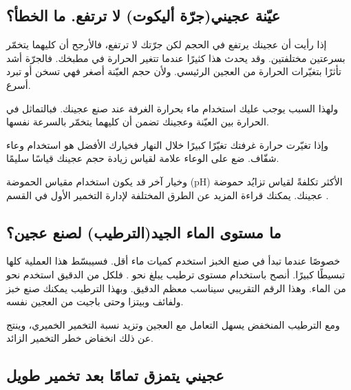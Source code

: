 \subsection{عيّنة عجيني\textenglish{(}جرّة أليكوت\textenglish{)} لا ترتفع. ما الخطأ؟}

إذا رأيت أن عجينك يرتفع في الحجم لكن جرّتك لا ترتفع، فالأرجح أن كليهما يتخمّر بسرعتين مختلفتين. وقد يحدث هذا كثيرًا عندما تتغير الحرارة في مطبخك. فالجرّة أشد تأثرًا بتغيّرات الحرارة من العجين الرئيسي. ولأن حجم العيّنة أصغر فهي تسخن أو تبرد أسرع.

ولهذا السبب يوجب عليك استخدام ماء بحرارة الغرفة عند صنع عجينك. فبالتماثل في الحرارة بين العيّنة وعجينك تضمن أن كليهما يتخمّر بالسرعة نفسها.

وإذا تغيّرت حرارة غرفتك تغيّرًا كبيرًا خلال النهار فخيارك الأفضل هو استخدام وعاء شفّاف. ضع على الوعاء علامة لقياس زيادة حجم عجينك قياسًا سليمًا.

وخيار آخر قد يكون استخدام مقياس الحموضة \textenglish{(pH)} الأكثر تكلفةً لقياس تزايُد حموضة عجينك. يمكنك قراءة المزيد عن الطرق المختلفة لإدارة التخمير الأول في القسم .

\subsection{ما مستوى الماء الجيد\textenglish{(}الترطيب\textenglish{)} لصنع عجين؟}

خصوصًا عندما تبدأ في صنع الخبز استخدم كميات ماء أقل. فسيبسّط هذا العملية كلها تبسيطًا كبيرًا. أنصح باستخدام مستوى ترطيب يبلغ نحو . فلكل  من الدقيق استخدم نحو  من الماء. وهذا الرقم التقريبي سيناسب معظم الدقيق. وبهذا الترطيب يمكنك صنع خبز ولفائف وبيتزا وحتى باجيت من العجين نفسه.

ومع الترطيب المنخفض يسهل التعامل مع العجين وتزيد نسبة التخمير الخميري، وينتج عن ذلك انخفاض خطر التخمير الزائد.

\subsection{عجيني يتمزق تمامًا بعد تخمير طويل}

